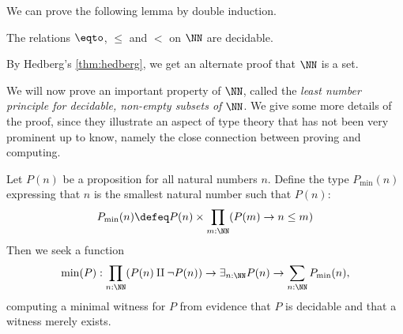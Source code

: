 We can prove the following lemma by double induction.

\begin{lemma}\label{lem:dec-eq+order-N}
The relations $ \eqto $, $\leq$ and $<$ on $\NN$ are decidable.
\end{lemma}
By Hedberg's \cref{thm:hedberg}, we get an alternate proof that $\NN$ is a set.

We will now prove an important property of $\NN$, called the
\emph{least number principle for decidable, non-empty subsets of} $\NN$.
We give some more details of the proof, since they illustrate an aspect
of type theory that has not been very prominent up to know, namely
the close connection between proving and computing.

\begin{construction}
\label{def:Nwellordered}
Let $P(n)$ be a proposition for all natural numbers $n$.
Define the type $P_{\min}(n)$ expressing that $n$ is the smallest
natural number such that $P(n)$:
\[
P_{\min}(n) \defeq P(n) \times \prod_{m:\NN} (P(m) \to n\leq m)
\]
Then we seek a function
\begin{equation}\label{eqn:min}
\min(P) : \prod_{n:\NN}(P(n)\amalg\neg P(n)) \to
          \exists_{n:\NN} P(n) \to \sum_{n:\NN} P_{\min}(n),
\end{equation}
computing a minimal witness for $P$
from evidence that $P$ is decidable and that a witness merely exists.
\end{construction}
